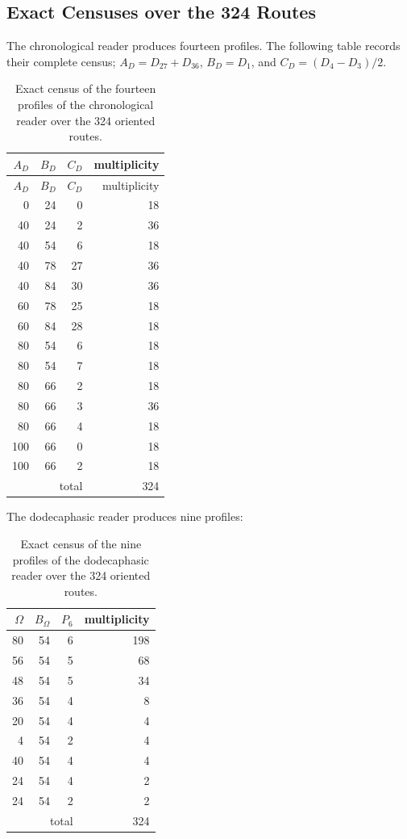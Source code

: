 \subsection{Exact Censuses over the 324 Routes}

The chronological reader produces fourteen profiles. The following table records their
complete census; \(A_D=D_{27}+D_{36}\), \(B_D=D_1\), and
\(C_D=(D_4-D_3)/2\).

\begin{longtable}{@{}rrr r@{}}
\caption{Exact census of the fourteen profiles of the chronological reader over the
324 oriented routes.}
\label{tab:censo-perfiles-kd-rev11}\\
\toprule
\(A_D\)&\(B_D\)&\(C_D\)&multiplicity\\
\midrule
\endfirsthead
\toprule
\(A_D\)&\(B_D\)&\(C_D\)&multiplicity\\
\midrule
\endhead
0&24&0&18\\
40&24&2&36\\
40&54&6&18\\
40&78&27&36\\
40&84&30&36\\
60&78&25&18\\
60&84&28&18\\
80&54&6&18\\
80&54&7&18\\
80&66&2&18\\
80&66&3&36\\
80&66&4&18\\
100&66&0&18\\
100&66&2&18\\
\midrule
\multicolumn{3}{r}{total}&324\\
\bottomrule
\end{longtable}

The dodecaphasic reader produces nine profiles:

\begin{table}[H]
\centering
\caption{Exact census of the nine profiles of the dodecaphasic reader over
the 324 oriented routes.}
\label{tab:censo-perfiles-komega-rev11}
\begin{tabular}{@{}rrr r@{}}
\toprule
\(\Omega\)&\(B_\Omega\)&\(P_6\)&multiplicity\\
\midrule
80&54&6&198\\
56&54&5&68\\
48&54&5&34\\
36&54&4&8\\
20&54&4&4\\
4&54&2&4\\
40&54&4&4\\
24&54&4&2\\
24&54&2&2\\
\midrule
\multicolumn{3}{r}{total}&324\\
\bottomrule
\end{tabular}
\end{table}

